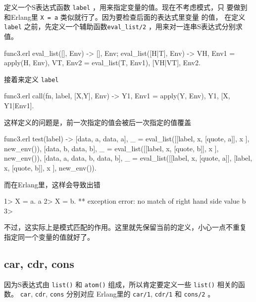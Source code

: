 \documentclass[preview,multi,crop=false,border=1in,class=memoir]{standalone}
\begin{document}
\begin{preview-page}
定义一个S表达式函数 \verb|label| ，用来指定变量的值。现在不考虑模式，只
要做到和Erlang里 \verb|X = a| 类似就行了。因为要检查后面的表达式里变量
的值， 在定义 \verb|label| 之前，先定义一个辅助函数\verb|eval_list/2|
，用来对一连串S表达式分别求值。

\begin{SourceCode}[36][41]{func3.erl}
eval_list([], Env) ->
    {[], Env};
eval_list([H|T], Env) ->
    {VH, Env1} = apply(H, Env),
    {VT, Env2} = eval_list(T, Env1),
    {[VH|VT], Env2}.
\end{SourceCode}

接着来定义 \verb|label|

\begin{SourceCode}[26][28]{func3.erl}
call({fn, label}, [X,Y], Env) ->
    {Y1, Env1} = apply(Y, Env),
    {Y1, [{X, Y1}|Env1]}.
\end{SourceCode}

这样定义的问题是，前一次指定的值会被后一次指定的值覆盖

\begin{SourceCode}[55][68]{func3.erl}
test(label) ->
    {[{data, a}, {data, a}], _} =
        eval_list([[label, x, [quote, a]],
                   x
                  ], new_env()),
    {[{data, b}, {data, b}], _} =
        eval_list([[label, x, [quote, b]],
                   x
                  ], new_env()),
    {[{data, a}, {data, b}, {data, b}], _} =
        eval_list([[label, x, [quote, a]],
                   [label, x, [quote, b]],
                   x
                  ], new_env()).
\end{SourceCode}

而在Erlang里，这样会导致出错

\begin{ErlangShellSession}
1> X = a.
a
2> X = b.
** exception error: no match of right hand side value b
3>
\end{ErlangShellSession}

不过，这实际上是模式匹配的作用。这里就先保留当前的定义，小心一点不重复
指定同一个变量的值就好了。

\subsection{car, cdr, cons}

因为S表达式由 \verb|list()| 和 \verb|atom()| 组成，所以肯定要定义一些
\verb|list()| 相关的函数。 \verb|car|, \verb|cdr|, \verb|cons| 分别对应
Erlang里的 \verb|car/1|, \verb|cdr/1| 和 \verb|cons/2| 。


\end{preview-page}
\end{document}
